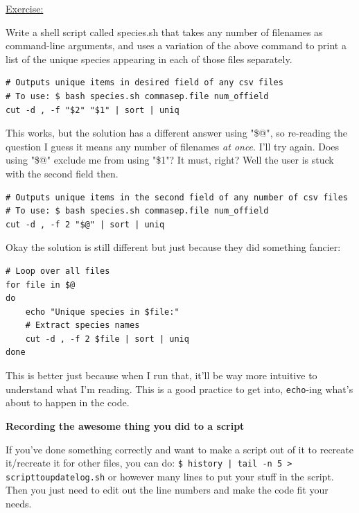 \documentclass[12pt]{article}
\begin{document}
\begin{addmargin}[1cm]{0cm}
\color{gray}
\vspace{1em}\underline{Exercise:}

Write a shell script called species.sh that takes any number of filenames as command-line arguments, and uses a variation of the above command to print a list of the unique species appearing in each of those files separately.
\color{black}

\vspace{-1em}\begin{verbatim}
# Outputs unique items in desired field of any csv files
# To use: $ bash species.sh commasep.file num_offield
cut -d , -f "$2" "$1" | sort | uniq
\end{verbatim}\vspace{-0.5em}
This works, but the solution has a different answer using "\$@", so re-reading the question I guess it means any number of filenames \textit{at once}. I'll try again. Does using "\$@" exclude me from using "\$1"? It must, right? Well the user is stuck with the second field then.
\vspace{-1em}\begin{verbatim}
# Outputs unique items in the second field of any number of csv files
# To use: $ bash species.sh commasep.file num_offield
cut -d , -f 2 "$@" | sort | uniq
\end{verbatim}\vspace{-1em}
Okay the solution is still different but just because they did something fancier:
\vspace{-1em}\color{gray}\begin{verbatim}
# Loop over all files
for file in $@
do
    echo "Unique species in $file:"
    # Extract species names
    cut -d , -f 2 $file | sort | uniq
done
\end{verbatim}\color{black}\vspace{-0.5em}
This is better just because when I run that, it'll be way more intuitive to understand what I'm reading. This is a good practice to get into, \texttt{echo}-ing what's about to happen in the code.
\end{addmargin}

\vspace{0.5em}\textbf{Recording the awesome thing you did to a script}

If you've done something correctly and want to make a script out of it to recreate it/recreate it for other files, you can do: \texttt{\$ history | tail -n 5 > scripttoupdatelog.sh} or however many lines to put your stuff in the script. Then you just need to edit out the line numbers and make the code fit your needs.
\end{document}
